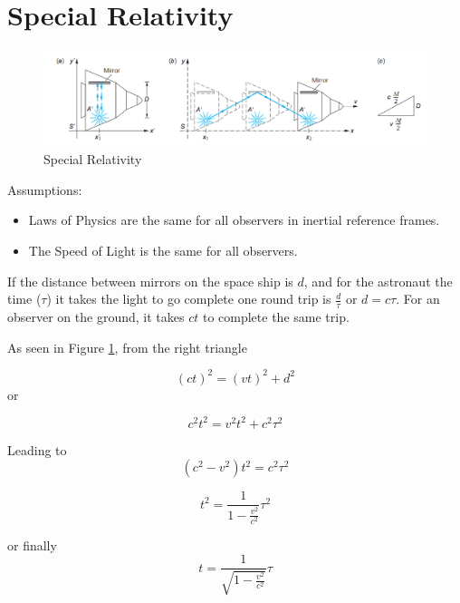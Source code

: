 \documentclass[14pt]{memoir}
\begin{document}
\section{Special Relativity}

\begin{figure}[H]
\begin{center}
\includegraphics[scale=0.5]{fig/lightclock.png}
\caption{Special Relativity}
\label{fig:lc}
\end{center}
\end{figure} 


Assumptions:
\begin{itemize}
\item Laws of Physics are the same for all observers in inertial reference frames.
\item The Speed of Light is the same for all observers.  
\end{itemize}

If the distance between mirrors on the space ship is $d$, and for the astronaut the time ($\tau$) it takes the light to go complete one round trip is $\frac{d}{\tau}$ or $d = c \tau$. For an observer on the ground, it takes $ct$ to complete the same trip.

As seen in Figure \ref{fig:lc}, from the right triangle

\begin{equation}
(ct)^2 = (vt)^2 + d^2
\end{equation}
or

\begin{equation}
c^2 t^2 = v^2 t^2 + c^2 \tau^2
\end{equation}

Leading to
\begin{equation}
(c^2 - v^2) t^2 = c^2 \tau^2
\end{equation}

\begin{equation}
t^2 = \frac{1}{1 - \frac{v^2}{c^2}} \tau^2
\end{equation}

or finally
\begin{equation}
t = \frac{1}{\sqrt{1 - \frac{v^2}{c^2}}} \tau
\end{equation}
\end{document}
